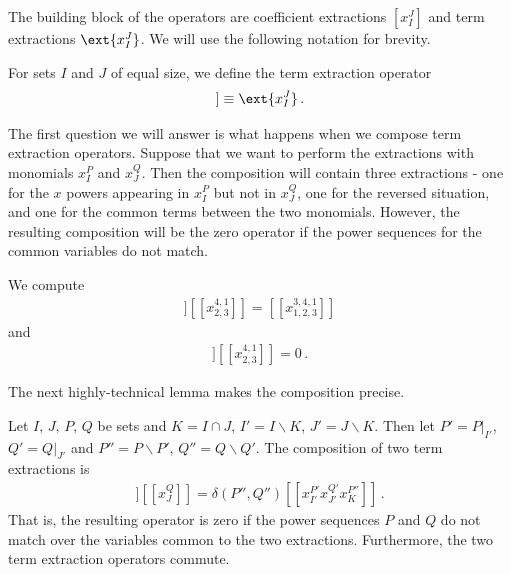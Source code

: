 The building block of the operators are coefficient extractions $[x_I^J]$ and term extractions $\ext{x_I^J}$. We will use the following notation for brevity.
\begin{definition} For sets $I$ and $J$ of equal size, we define the term extraction operator
\begin{align}
	[[x_I^J]] \equiv \ext{x_I^J}\,.
\end{align}
\end{definition}
The first question we will answer is what happens when we compose term extraction operators. Suppose that we want to perform the extractions with monomials $x_I^P$ and $x_J^Q$. Then the composition will contain three extractions - one for the $x$ powers appearing in $x_I^P$ but not in $x_J^Q$, one for the reversed situation, and one for the common terms between the two monomials. However, the resulting composition will be the zero operator if the power sequences for the common variables do not match.
\begin{example} We compute
\begin{align}
	[[x_{1,2}^{3,4}]][[x_{2,3}^{4,1}]] = [[x_{1,2,3}^{3,4,1}]]
\end{align}
and
\begin{align}
	[[x_{1,2}^{3,2}]][[x_{2,3}^{4,1}]] = 0\,.
\end{align}
\end{example}
The next highly-technical lemma makes the composition precise.
\begin{lemma} Let $I,\, J,\, P,\, Q$ be sets and $K = I\cap J$, $I' = I\backslash K$, $J' = J \backslash K$. Then let $P' = P|_{I'}$, $Q' = Q|_{J'}$ and $P'' = P\backslash P'$, $Q'' = Q\backslash Q'$. The composition of two term extractions is
\begin{align}
	[[x_I^P]][[x_J^Q]] = \delta(P'',Q'')[[x_{I'}^{P'}x_{J'}^{Q'}x_K^{P''}]]\,.
\end{align}
That is, the resulting operator is zero if the power sequences $P$ and $Q$ do not match over the variables common to the two extractions. Furthermore, the two term extraction operators commute.
\end{lemma}


